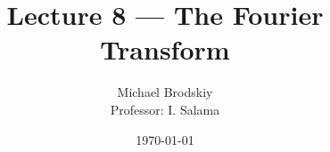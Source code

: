 


\title{Lecture 8 — The Fourier Transform}
\date{\today}
\author{Michael Brodskiy\\ \small Professor: I. Salama}



\maketitle

